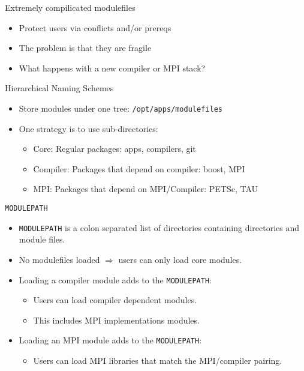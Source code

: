 \documentclass[dvipsnames,aspectratio=169]{beamer}
\begin{document}
\begin{frame}{Extremely compilicated modulefiles}
  \begin{itemize}
    \item Protect users via conflicts and/or prereqs
    \item The problem is that they are fragile
    \item What happens with a new compiler or MPI stack?
  \end{itemize}
\end{frame}

\begin{frame}{Hierarchical Naming Schemes}
  \begin{itemize}
    \item Store modules under one tree: \texttt{/opt/apps/modulefiles}
    \item One strategy is to use sub-directories:
      \begin{itemize}
        \item Core: Regular packages: apps, compilers, git
        \item Compiler: Packages that depend on compiler: boost, MPI
        \item MPI: Packages that depend on MPI/Compiler: PETSc, TAU
      \end{itemize}
  \end{itemize}
\end{frame}

\begin{frame}{\texttt{MODULEPATH}}
  \begin{itemize}
    \item \texttt{MODULEPATH} is a colon separated list of directories
      containing directories and module files.
    \item No modulefiles loaded $\Rightarrow$ users can only load core modules.
    \item Loading a compiler module adds to the \texttt{MODULEPATH}:
      \begin{itemize}
        \item Users can load compiler dependent modules.
        \item This includes MPI implementations modules.
      \end{itemize}
    \item Loading an MPI module adds to the \texttt{MODULEPATH}:
      \begin{itemize}
        \item Users can load MPI libraries that match the MPI/compiler pairing.
      \end{itemize}
  \end{itemize}
\end{frame}
\end{document}
